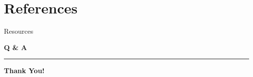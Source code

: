 \documentclass[12pt]{beamer}
\begin{document}
    \section{References}
    \begin{frame}[allowframebreaks]{Resources}
        
        \printbibliography
        
    \end{frame}

    \begin{frame}
        
        \vfill
        \begin{center}
             \Huge \textbf{Q \& A}
             \rule{\linewidth}{1.5pt} \newline
             \Huge \textbf{Thank You!}
        \end{center}
        \vfill
        
    \end{frame}
 
\end{document}
